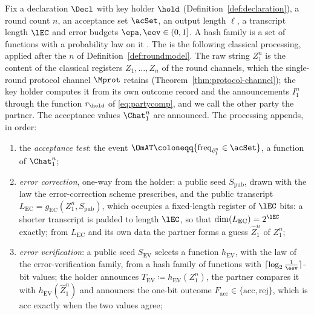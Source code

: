 \begin{definition}
\label{def:postprocessing-model}
Fix a declaration $\Decl$ with key holder $\hold$
(Definition~\ref{def:declaration}), a round count $n$, an acceptance set
$\acSet$, an output length $\ell$, a transcript length $\lEC$ and error
budgets $\epa,\eev\in(0,1]$. A hash family is a set of functions with a
probability law on it \cite[Def.~3.5]{tupkary2026decoy}. The
is the following classical processing, applied after the $n$
 of Definition~\ref{def:roundmodel}.
The raw string $Z_1^n$ is the content of the classical registers
$Z_1,\dots,Z_n$ of the round channels, which the single-round protocol channel
$\Mprot$ retains (Theorem~\ref{thm:protocol-channel}); the key holder computes
it from its own outcome record and the announcements $I_1^n$ through the
function $r_{\hold}$ of \eqref{eq:partycomp}, and we call the other party the
partner. The acceptance values $\Chat_1^n$ are announced. The processing
appends, in order:
\begin{enumerate}[label=(\roman*),leftmargin=2.4em]
\item the \emph{acceptance test}: the event
  $\OmAT\coloneqq\{\operatorname{freq}_{\hat c_1^n}\in\acSet\}$, a function
  of $\Chat_1^n$;
\item \emph{error correction}, one-way from the holder: a public seed
  $S_{\mathrm{pub}}$, drawn with the law the error-correction scheme
  prescribes, and the public transcript
  $L_{\mathrm{EC}}=g_{\mathrm{EC}}(Z_1^n,S_{\mathrm{pub}})$, which occupies
  a fixed-length register of $\lEC$ bits: a shorter transcript is padded to
  length $\lEC$, so that $\dim(L_{\mathrm{EC}})=2^{\lEC}$ exactly; from
  $L_{\mathrm{EC}}$ and its own data the partner forms a guess $\hat Z_1^n$
  of $Z_1^n$;
\item \emph{error verification}: a public seed $S_{\mathrm{EV}}$ selects a
  function $h_{\mathrm{EV}}$, with the law of the error-verification family,
  from a hash family of functions with
  $\lceil\log_2\frac1{\eev}\rceil$-bit values; the holder announces
  $T_{\mathrm{EV}}\coloneqq h_{\mathrm{EV}}(Z_1^n)$, the partner compares it
  with $h_{\mathrm{EV}}(\hat Z_1^n)$ and announces the one-bit outcome
  $F_{\mathrm{acc}}\in\{\mathrm{acc},\mathrm{rej}\}$, which is
  $\mathrm{acc}$ exactly when the two values agree;

\end{enumerate}
\end{definition}
